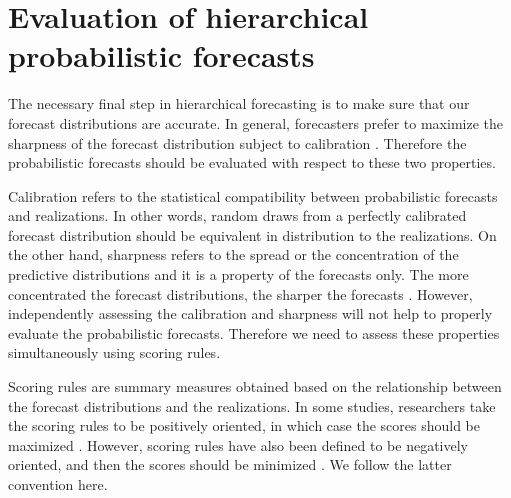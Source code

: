 \documentclass[a4paper, 11pt]{article}
\theoremstyle{theo}
\theoremstyle{definition}
\begin{document}

\section{Evaluation of hierarchical probabilistic forecasts}\label{sec:evaluation}

The necessary final step in hierarchical forecasting is to make sure that our forecast distributions are accurate. In general, forecasters prefer to maximize the sharpness of the forecast distribution subject to calibration \citep{Gneiting2014}. Therefore the probabilistic forecasts should be evaluated with respect to these two properties.

Calibration refers to the statistical compatibility between probabilistic forecasts and realizations. In other words, random draws from a perfectly calibrated forecast distribution should be equivalent in distribution to the realizations. On the other hand, sharpness refers to the spread or the concentration of the predictive distributions and it is a property of the forecasts only. The more concentrated the forecast distributions, the sharper the forecasts \citep{Gneiting2008}. However, independently assessing the calibration and sharpness will not help to properly evaluate the probabilistic forecasts. Therefore we need to assess these properties simultaneously using scoring rules.

Scoring rules are summary measures obtained based on the relationship between the forecast distributions and the realizations. In some studies, researchers take the scoring rules to be positively oriented, in which case the scores should be maximized \citep{Gneiting2007}. However, scoring rules have also been defined to be negatively oriented, and then the scores should be minimized \citep{Gneiting2014}. We follow the latter convention here.
\end{document}
